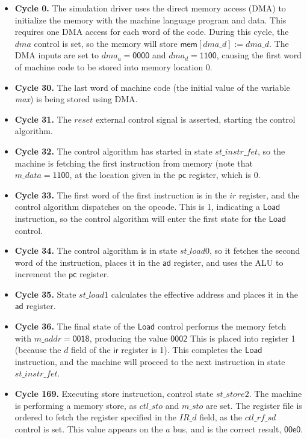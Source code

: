 \documentclass[a4paper,openany,fleqn]{book}
\begin{document}
\begin{itemize}
\item \textbf{Cycle 0.} The simulation driver uses the direct memory
  access (DMA) to initialize the memory with the machine language
  program and data.  This requires one DMA access for each word of the
  code. During this cycle, the $\mathit{dma}$ control is set, so the
  memory will store $\mathsf{mem}[\mathit{dma\_d}] :=
  \mathit{dma\_d}$.  The DMA inputs are set to
  $\mathit{dma_a}=\mathsf{0000}$ and $\mathit{dma_d}=\mathsf{1100}$,
  causing the first word of machine code to be stored into memory
  location 0.
\item \textbf{Cycle 30.} The last word of machine code (the initial
  value of the variable \textit{max}) is being stored using DMA.
\item \textbf{Cycle 31.} The $\mathit{reset}$ external control signal
  is asserted, starting the control algorithm.
\item \textbf{Cycle 32.} The control algorithm has started in state
  $\mathit{st\_instr\_fet}$, so the machine is fetching the first
  instruction from memory (note that $\mathit{m\_data}=\mathsf{1100}$,
  at the location given in the $\mathsf{pc}$ register, which is 0.
\item \textbf{Cycle 33.} The first word of the first instruction is in
  the $\mathit{ir}$ register, and the control algorithm dispatches on
  the opcode.  This is 1, indicating a $\mathsf{Load}$ instruction, so
  the control algorithm will enter the first state for the
  $\mathsf{Load}$ control.
\item \textbf{Cycle 34.} The control algorithm is in state
  $\mathit{st\_load0}$, so it fetches the second word of the
  instruction, places it in the $\mathsf{ad}$ register, and uses the
  ALU to increment the $\mathsf{pc}$ register.
\item \textbf{Cycle 35.}  State $\mathit{st\_load1}$ calculates the
  effective address and places it in the $\mathsf{ad}$ register.
\item \textbf{Cycle 36.} The final state of the $\mathsf{Load}$
  control performs the memory fetch with
  $\mathit{m\_addr}=\mathsf{0018}$, producing the value
  $\mathsf{0002}$ This is placed into register 1 (because the $d$
  field of the $\mathsf{ir}$ register is 1).  This completes the
  $\mathsf{Load}$ instruction, and the machine will proceed to the
  next instruction in state $\mathit{st\_instr\_fet}$.
\item \textbf{Cycle 169.}  Executing store instruction, control state
  $\mathit{st\_store2}$.  The machine is performing a memory store, as
  $\mathit{ctl\_sto}$ and $\mathit{m\_sto}$ are set.  The register
  file is ordered to fetch the register specified in the
  $\mathit{IR\_d}$ field, as the $\mathit{ctl\_rf\_sd}$ control is
  set.  This value appears on the $a$ bus, and is the correct result,
  $\mathsf{00e0}$.
\end{itemize}
\end{document}
